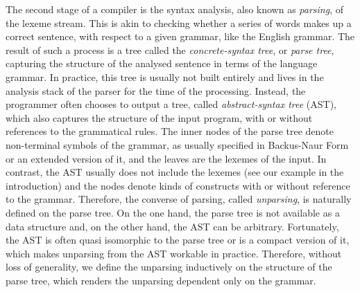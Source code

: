 The second stage of a compiler is the syntax analysis, also known as
\emph{parsing}, of the lexeme stream. This is akin to checking whether
a series of words makes up a correct sentence, with respect to a given
grammar, like the English grammar. The result of such a process is a
tree called the \emph{concrete\hyp{}syntax tree}, or \emph{parse
tree}, capturing the structure of the analysed sentence in terms of
the language grammar. In practice, this tree is usually not built
entirely and lives in the analysis stack of the parser for the time of
the processing. Instead, the programmer often chooses to output a
tree, called \emph{abstract\hyp{}syntax tree} (AST), which also
captures the structure of the input program, with or without
references to the grammatical rules. The inner nodes of the parse tree
denote non\hyp{}terminal symbols of the grammar, as usually specified
in Backus\hyp{}Naur Form or an extended version of it, and the leaves
are the lexemes of the input. In contrast, the AST usually does not
include the lexemes (see our example in the introduction) and the
nodes denote kinds of constructs with or without reference to the
grammar. Therefore, the converse of parsing, called \emph{unparsing},
is naturally defined on the parse tree. On the one hand, the parse
tree is not available as a data structure and, on the other hand, the
AST can be arbitrary. Fortunately, the AST is often quasi isomorphic
to the parse tree or is a compact version of it, which makes unparsing
from the AST workable in practice. Therefore, without loss of
generality, we define the unparsing inductively on the structure of
the parse tree, which renders the unparsing dependent only on the
grammar.

